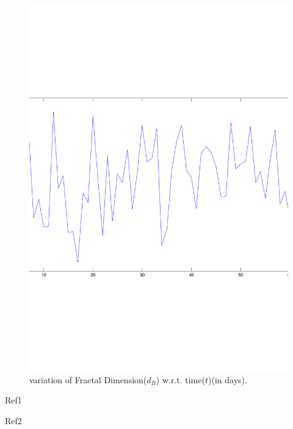 \documentclass{article}
\begin{document}
\begin{figure}
\centering
\includegraphics[scale=0.3]{fd/fd_plot}
\caption{variation of Fractal Dimension($d_B$) w.r.t. time($t$)(in days).}
\end{figure}


\begin{thebibliography}{9}

Ref1

Ref2

\end{thebibliography}
\end{document}
